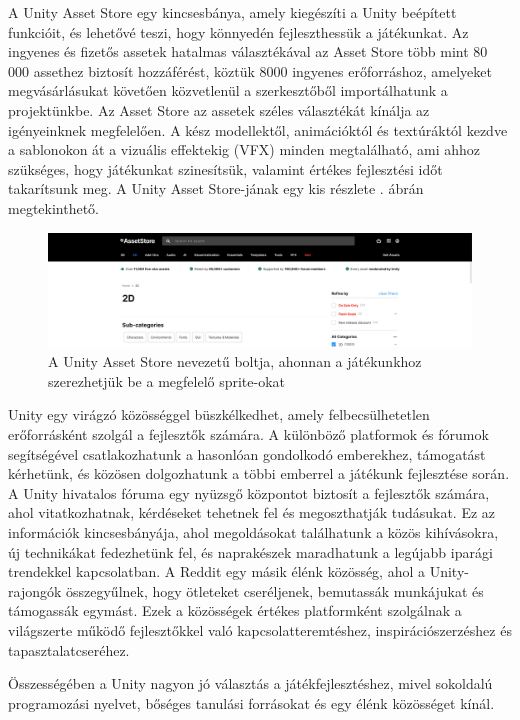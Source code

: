 A Unity Asset Store egy kincsesbánya, amely kiegészíti a Unity beépített funkcióit, és lehetővé teszi, hogy könnyedén fejleszthessük a játékunkat. Az ingyenes és fizetős assetek hatalmas választékával az Asset Store több mint 80 000 assethez biztosít hozzáférést, köztük 8000 ingyenes erőforráshoz, amelyeket megvásárlásukat követően közvetlenül a szerkesztőből importálhatunk a projektünkbe. Az Asset Store az assetek széles választékát kínálja az igényeinknek megfelelően. A kész modellektől, animációktól és textúráktól kezdve a sablonokon át a vizuális effektekig (VFX) minden megtalálható, ami ahhoz szükséges, hogy játékunkat szinesítsük, valamint értékes fejlesztési időt takarítsunk meg. \cite{unity2} A Unity Asset Store-jának egy kis részlete . ábrán megtekinthető.

\begin{figure}[ht]
\centering
\includegraphics[scale = 0.3]{images/unity_asset_store.png}
\caption{A Unity Asset Store nevezetű boltja, ahonnan a játékunkhoz szerezhetjük be a megfelelő sprite-okat \cite{unityassetstore}}
\label{fig:unityassetstore}
\end{figure}

Unity egy virágzó közösséggel büszkélkedhet, amely felbecsülhetetlen erőforrásként szolgál a fejlesztők számára. A különböző platformok és fórumok segítségével csatlakozhatunk a hasonlóan gondolkodó emberekhez, támogatást kérhetünk, és közösen dolgozhatunk a többi emberrel a játékunk fejlesztése során. A Unity hivatalos fóruma egy nyüzsgő központot biztosít a fejlesztők számára, ahol vitatkozhatnak, kérdéseket tehetnek fel és megoszthatják tudásukat. Ez az információk kincsesbányája, ahol megoldásokat találhatunk a közös kihívásokra, új technikákat fedezhetünk fel, és naprakészek maradhatunk a legújabb iparági trendekkel kapcsolatban. A Reddit egy másik élénk közösség, ahol a Unity-rajongók összegyűlnek, hogy ötleteket cseréljenek, bemutassák munkájukat és támogassák egymást. Ezek a közösségek értékes platformként szolgálnak a világszerte működő fejlesztőkkel való kapcsolatteremtéshez, inspirációszerzéshez és tapasztalatcseréhez.  \cite{unity2}

Összességében a Unity nagyon jó választás a játékfejlesztéshez, mivel sokoldalú programozási nyelvet, bőséges tanulási forrásokat és egy élénk közösséget kínál.
